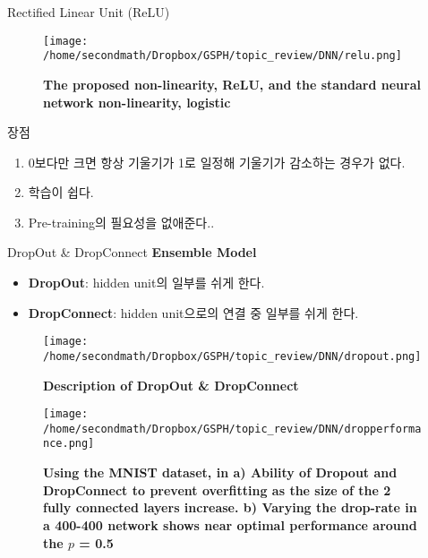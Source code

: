 \documentclass{beamer}
\begin{document}
\begin{frame}{Rectified Linear Unit (ReLU)}
\begin{figure}[!ht]
\centering
\texttt{[image: /home/secondmath/Dropbox/GSPH/topic\_review/DNN/relu.png]}
\caption{\bf{The proposed non-linearity, ReLU, and the standard neural network non-linearity, logistic\citep{zeiler2013rectified}}}
\end{figure}
\end{frame}

\begin{frame}{장점}
\begin{enumerate}
  \item 0보다만 크면 항상 기울기가 1로 일정해 기울기가 감소하는 경우가 없다. 
  \item 학습이 쉽다. 
  \item Pre-training의 필요성을 없애준다.\citep{nair2010rectified,glorot2011deep}.
\end{enumerate}
\end{frame}

\begin{frame}{DropOut \& DropConnect}
\textbf{Ensemble Model}
\begin{itemize}
  \item \textbf{DropOut}: hidden unit의 일부를 쉬게 한다\citep{hinton2012improving}. 
  \item \textbf{DropConnect}: hidden unit으로의 연결 중 일부를 쉬게 한다\citep{wan2013regularization}. 
\end{itemize}
\end{frame}

\begin{frame}
\begin{figure}[!ht]
\centering
\texttt{[image: /home/secondmath/Dropbox/GSPH/topic\_review/DNN/dropout.png]}
\caption{\bf{Description of DropOut \& DropConnect\citep{dropfig}}}
\end{figure}
\end{frame}

\begin{frame}
\begin{figure}[!ht]
\centering
\texttt{[image: /home/secondmath/Dropbox/GSPH/topic\_review/DNN/dropperformance.png]}
\caption{\bf{Using the MNIST dataset, in a) Ability of Dropout and DropConnect to prevent overfitting as the size of the 2 fully connected layers increase. b) Varying the drop-rate in a 400-400 network shows near optimal performance around the $p$ = 0.5\citep{wan2013regularization}}}
\label{dropperformance}
\end{figure}
\end{frame}
\end{document}
